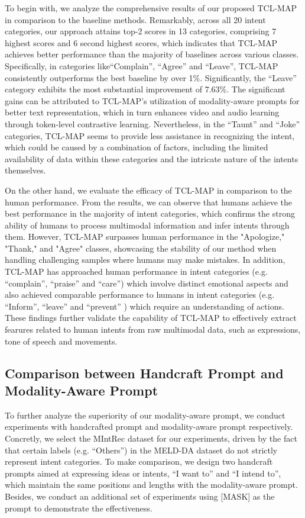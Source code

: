 \documentclass[letterpaper]{article} %
\begin{document}
To begin with, we analyze the comprehensive results of our proposed TCL-MAP in comparison to the baseline methods. Remarkably, across all 20 intent categories, our approach attains top-2 scores in 13 categories, comprising 7 highest scores and 6 second highest scores, which indicates that  TCL-MAP achieves better performance than the majority of baselines across various classes. Specifically, in categories like``Complain'', ``Agree'' and ``Leave'', TCL-MAP consistently outperforms the best baseline by over 1\%. Significantly, the ``Leave'' category exhibits the most substantial improvement of 7.63\%. The significant gains can be attributed to TCL-MAP's utilization of modality-aware prompts for better text representation, which in turn enhances video and audio learning through token-level contrastive learning. Nevertheless, in the ``Taunt'' and ``Joke'' categories, TCL-MAP seems to provide less assistance in recognizing the intent, which could be caused by a combination of factors, including the limited availability of data within these categories and the intricate nature of the intents themselves.

On the other hand, we evaluate the efficacy of TCL-MAP in comparison to the human performance. From the results, we can observe that humans achieve the best performance in the majority of intent categories, which confirms the strong ability of humans to process multimodal information and infer intents through them. However, TCL-MAP surpasses human performance in the "Apologize," "Thank," and "Agree" classes, showcasing the stability of our method when handling challenging samples where humans may make mistakes. In addition, TCL-MAP has approached human performance in intent categories (e.g. ``complain'', ``praise'' and ``care'') which involve distinct emotional aspects and also achieved comparable performance to humans in intent categories (e.g. ``Inform'', ``leave'' and ``prevent'' ) which require an understanding of actions. These findings further validate the capability of TCL-MAP to effectively extract fearures related to human intents from raw multimodal data, such as expressions, tone of speech and movements.


\subsection{Comparison between Handcraft Prompt and Modality-Aware Prompt}
To further analyze the superiority of our modality-aware prompt, we conduct experiments with handcrafted prompt and modality-aware prompt respectively. Concretly, we select the MIntRec dataset for our experiments, driven by the fact that certain labels (e.g. ``Others'') in the MELD-DA dataset do not strictly represent intent categories. To make comparison, we design two handcraft prompts aimed at expressing ideas or intents, ``I want to'' and ``I intend to'', which maintain the same positions and lengths with the modality-aware prompt. Besides, we conduct an additional set of experiments using [MASK] as the prompt to demonstrate the effectiveness.
\end{document}
